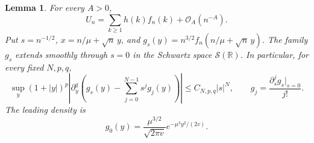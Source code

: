 \documentclass[11pt]{article}
\newtheorem{lemma}[theorem]{Lemma}
\theoremstyle{definition}\newtheorem{definition}[theorem]{Definition}
\theoremstyle{remark}\newtheorem{remark}[theorem]{Remark}
\newcommand{\OO}{\mathcal O}
\newcommand{\RR}{\mathbb R}
\begin{document}
\begin{lemma}\label{dep:hl:lem:interpolation}
For every $A>0$,
\begin{equation}\label{dep:hl:eq:interpolation}
 U_n=\sum_{k\ge1}h(k)f_n(k)+\OO_A(n^{-A}).
\end{equation}
Put $s=n^{-1/2}$, $x=n/\mu+\sqrt n\,y$, and
$g_s(y)=n^{3/2}f_n(n/\mu+\sqrt n\,y)$.
The family $g_s$ extends smoothly through $s=0$ in the Schwartz space
$\mathcal S(\RR)$. In particular, for every fixed $N,p,q$,
\begin{equation}\label{dep:hl:eq:schwartz}
 \sup_y(1+|y|)^p\left|\partial_y^q
 \left(g_s(y)-\sum_{j=0}^{N-1}s^jg_j(y)\right)\right|
 \le C_{N,p,q}|s|^N,
 \qquad g_j=\frac{\partial_s^jg_s|_{s=0}}{j!}.
\end{equation}
The leading density is
\begin{equation}\label{dep:hl:eq:g0}
 g_0(y)=\frac{\mu^{3/2}}{\sqrt{2\pi v}}
                   e^{-\mu^3y^2/(2v)}.
\end{equation}
\end{lemma}
\end{document}

